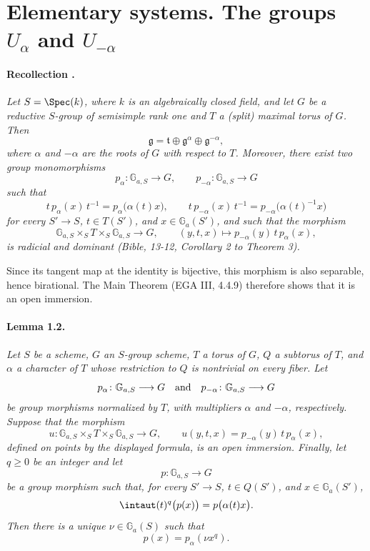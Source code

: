 


\section{Elementary systems. The groups \(U_\alpha\) and \(U_{-\alpha}\)}

\paragraph{\textbf{Recollection .}}
\emph{Let \(S=\Spec(k)\), where \(k\) is an algebraically closed
field, and let \(G\) be a reductive \(S\)-group of semisimple rank
one and \(T\) a (split) maximal torus of \(G\). Then}
\[
  \mathfrak g=\mathfrak t\oplus\mathfrak g^\alpha
  \oplus\mathfrak g^{-\alpha},
\]
\emph{where \(\alpha\) and \(-\alpha\) are the roots of \(G\) with
respect to \(T\). Moreover, there exist two group monomorphisms}
\[
  p_\alpha\colon\mathbb G_{a,S}\longrightarrow G,
  \qquad
  p_{-\alpha}\colon\mathbb G_{a,S}\longrightarrow G
\]
\emph{such that}
\[
  t\,p_\alpha(x)\,t^{-1}=p_\alpha\bigl(\alpha(t)x\bigr),
  \qquad
  t\,p_{-\alpha}(x)\,t^{-1}
    =p_{-\alpha}\bigl(\alpha(t)^{-1}x\bigr)
\]
\emph{for every \(S'\to S\), \(t\in T(S')\), and
\(x\in\mathbb G_a(S')\), and such that the morphism}
\[
  \mathbb G_{a,S}\times_S T\times_S\mathbb G_{a,S}
    \longrightarrow G,
  \qquad
  (y,t,x)\longmapsto p_{-\alpha}(y)\,t\,p_\alpha(x),
\]
\emph{is radicial and dominant \textup{(\emph{Bible}, 13-12,
Corollary 2 to Theorem 3)}.}

Since its tangent map at the identity is bijective, this morphism is
also separable, hence birational. The Main Theorem
\textup{(EGA III, 4.4.9)} therefore shows that it is an open
immersion.

\paragraph{\textbf{Lemma 1.2.}}
\emph{Let \(S\) be a scheme, \(G\) an \(S\)-group scheme, \(T\) a
torus of \(G\), \(Q\) a subtorus of \(T\), and \(\alpha\) a
character of \(T\) whose restriction to \(Q\) is nontrivial on every
fiber. Let
\[
  p_\alpha\colon\mathbb G_{a,S}\longrightarrow G
  \quad\textup{and}\quad
  p_{-\alpha}\colon\mathbb G_{a,S}\longrightarrow G
\]
be group morphisms normalized by \(T\), with multipliers \(\alpha\)
and \(-\alpha\), respectively. Suppose that the morphism
\[
  u\colon\mathbb G_{a,S}\times_S T\times_S\mathbb G_{a,S}
    \longrightarrow G,
  \qquad
  u(y,t,x)=p_{-\alpha}(y)\,t\,p_\alpha(x),
\]
defined on points by the displayed formula, is an open immersion.
Finally, let \(q\geq 0\) be an integer and let
\[
  p\colon\mathbb G_{a,S}\longrightarrow G
\]
be a group morphism such that, for every \(S'\to S\),
\(t\in Q(S')\), and \(x\in\mathbb G_a(S')\),
\[
  \intaut(t)^q\bigl(p(x)\bigr)=p\bigl(\alpha(t)x\bigr).
\]
Then there is a unique \(\nu\in\mathbb G_a(S)\) such that
\[
  p(x)=p_\alpha(\nu x^q).
\]}

